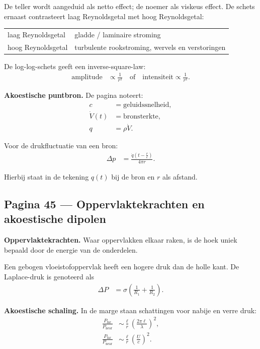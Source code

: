 \documentclass[11pt]{article}
\begin{document}
De teller wordt aangeduid als netto effect; de noemer als viskeus effect. De schets ernaast contrasteert laag Reynoldsgetal met hoog Reynoldsgetal:
\begin{center}
\begin{tabular}{>{\raggedright\arraybackslash}p{6cm}p{7cm}}
laag Reynoldsgetal & gladde / laminaire stroming \\
hoog Reynoldsgetal & turbulente rookstroming, wervels en verstoringen
\end{tabular}
\end{center}

De log-log-schets geeft een inverse-square-law:
\begin{align*}
\text{amplitude}
  &\propto \frac{1}{r^2}
  \quad\text{of}\quad
  \text{intensiteit}
  \propto \frac{1}{r^2}.
\end{align*}

\textbf{Akoestische puntbron.}
De pagina noteert:
\begin{align*}
c &= \text{geluidssnelheid},\\
\dot{V}(t) &= \text{bronsterkte},\\
q &= \rho\dot{V}.
\end{align*}

Voor de drukfluctuatie van een bron:
\begin{align*}
\Delta p
  &=
  \frac{\dot{q}\left(t-\frac{r}{c}\right)}{4\pi r}.
\end{align*}

Hierbij staat in de tekening $q(t)$ bij de bron en $r$ als afstand.

\subsection*{Pagina 45 --- Oppervlaktekrachten en akoestische dipolen}

\textbf{Oppervlaktekrachten.}
Waar oppervlakken elkaar raken, is de hoek uniek bepaald door de energie van de onderdelen.

Een gebogen vloeistofoppervlak heeft een hogere druk dan de holle kant. De Laplace-druk is genoteerd als
\begin{align*}
\Delta P
  &=
  \sigma
  \left(
     \frac{1}{R_1}
     +\frac{1}{R_2}
  \right).
\end{align*}

\textbf{Akoestische schaling.}
In de marge staan schattingen voor nabije en verre druk:
\begin{align*}
\frac{P_{\mathrm{far}}}{P_{\mathrm{near}}}
  &\sim
  \frac{\ell}{r}
  \left(\frac{2\pi\ell}{\lambda}\right)^2,\\
\frac{P_{\mathrm{far}}}{P_{\mathrm{near}}}
  &\sim
  \frac{\ell}{r}
  \left(\frac{U}{c}\right)^2.
\end{align*}
\end{document}
